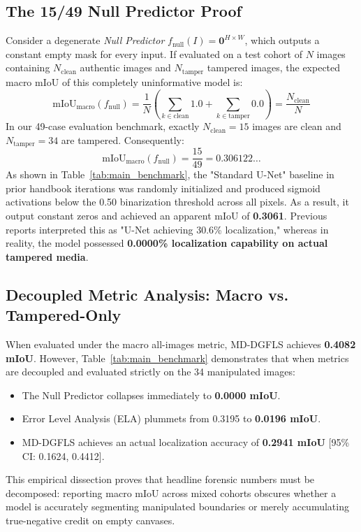 \documentclass[conference]{IEEEtran}
\begin{document}
\subsection{The 15/49 Null Predictor Proof}
Consider a degenerate \textit{Null Predictor} $f_{\text{null}}(I) = \mathbf{0}^{H \times W}$, which outputs a constant empty mask for every input. If evaluated on a test cohort of $N$ images containing $N_{\text{clean}}$ authentic images and $N_{\text{tamper}}$ tampered images, the expected macro mIoU of this completely uninformative model is:
\begin{equation}
    \text{mIoU}_{\text{macro}}(f_{\text{null}}) = \frac{1}{N} \left( \sum_{k \in \text{clean}} 1.0 + \sum_{k \in \text{tamper}} 0.0 \right) = \frac{N_{\text{clean}}}{N}
\end{equation}
In our 49-case evaluation benchmark, exactly $N_{\text{clean}} = 15$ images are clean and $N_{\text{tamper}} = 34$ are tampered. Consequently:
\begin{equation}
    \text{mIoU}_{\text{macro}}(f_{\text{null}}) = \frac{15}{49} = 0.306122 \dots
\end{equation}
As shown in Table~\ref{tab:main_benchmark}, the "Standard U-Net" baseline in prior handbook iterations was randomly initialized and produced sigmoid activations below the 0.50 binarization threshold across all pixels. As a result, it output constant zeros and achieved an apparent mIoU of \textbf{0.3061}. Previous reports interpreted this as "U-Net achieving 30.6\% localization," whereas in reality, the model possessed \textbf{0.0000\% localization capability on actual tampered media}.

\subsection{Decoupled Metric Analysis: Macro vs. Tampered-Only}
When evaluated under the macro all-images metric, MD-DGFLS achieves \textbf{0.4082 mIoU}. However, Table~\ref{tab:main_benchmark} demonstrates that when metrics are decoupled and evaluated strictly on the 34 manipulated images:
\begin{itemize}
    \item The Null Predictor collapses immediately to \textbf{0.0000 mIoU}.
    \item Error Level Analysis (ELA) plummets from 0.3195 to \textbf{0.0196 mIoU}.
    \item MD-DGFLS achieves an actual localization accuracy of \textbf{0.2941 mIoU} [95\% CI: 0.1624, 0.4412].
\end{itemize}
This empirical dissection proves that headline forensic numbers must be decomposed: reporting macro mIoU across mixed cohorts obscures whether a model is accurately segmenting manipulated boundaries or merely accumulating true-negative credit on empty canvases.
\end{document}
